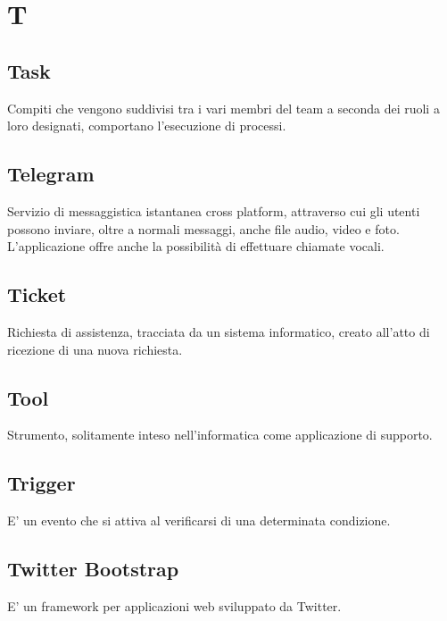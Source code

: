 \section*{T}

\subsection{Task}
Compiti che vengono suddivisi tra i vari membri del team a seconda dei ruoli a loro designati, comportano l'esecuzione di processi.

\subsection{Telegram}
Servizio di messaggistica istantanea cross platform, attraverso cui gli utenti possono inviare, oltre a normali messaggi, anche file audio, video e foto. L'applicazione offre anche la possibilità di effettuare chiamate vocali.

\subsection{Ticket}
Richiesta di assistenza, tracciata da un sistema informatico, creato all'atto di ricezione di una nuova richiesta.

\subsection{Tool}
Strumento, solitamente inteso nell'informatica come applicazione di supporto.

\subsection{Trigger}
E' un evento che si attiva al verificarsi di una determinata condizione.

\subsection{Twitter Bootstrap}
E' un framework per applicazioni web sviluppato da Twitter.


